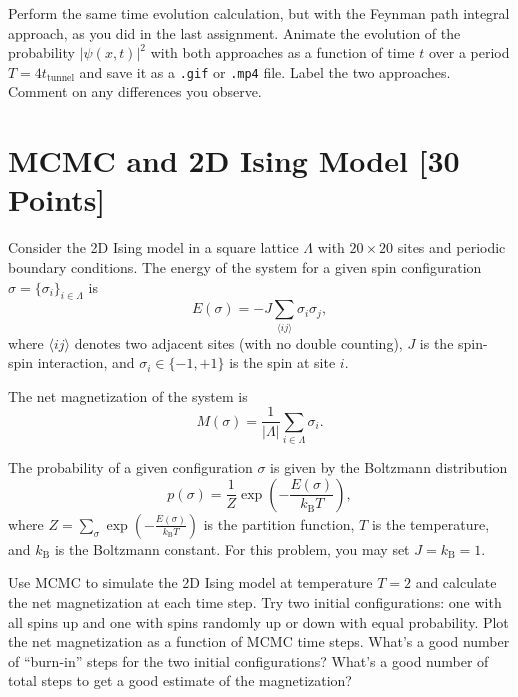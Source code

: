 \begin{problem}[10]
Perform the same time evolution calculation, but with the Feynman path integral approach, as you did in the last assignment.
Animate the evolution of the probability $|\psi(x, t)|^2$ with both approaches as a function of time $t$ over a period $T = 4t_\mathrm{tunnel}$ and save it as a \texttt{.gif} or \texttt{.mp4} file.
Label the two approaches.
Comment on any differences you observe.
\end{problem}

\begin{solution}
\end{solution}


\newpage
\section{MCMC and 2D Ising Model [30 Points]}

Consider the 2D Ising model in a square lattice $\Lambda$ with $20\times 20$ sites and periodic boundary conditions.
The energy of the system for a given spin configuration $\sigma = \{\sigma_i\}_{i\in \Lambda}$ is
\begin{equation}
  E(\sigma) = -J\sum_{\langle ij\rangle} \sigma_i\sigma_j,
\end{equation}
where $\langle i j \rangle$ denotes two adjacent sites (with no double counting), $J$ is the spin-spin interaction, and $\sigma_i \in \{ -1, +1\}$ is the spin at site $i$.

The net magnetization of the system is
\begin{equation}
  M(\sigma) = \frac{1}{|\Lambda|}\sum_{i\in \Lambda} \sigma_i.
\end{equation}

The probability of a given configuration $\sigma$ is given by the Boltzmann distribution
\begin{equation}
  p(\sigma) = \frac{1}{Z}\exp \left(-\frac{E(\sigma)}{k_\mathrm{B}T}\right),
\end{equation}
where $Z = \sum_{\sigma} \exp \left(-\frac{E(\sigma)}{k_\mathrm{B}T}\right)$ is the partition function, $T$ is the temperature, and $k_\mathrm{B}$ is the Boltzmann constant.
For this problem, you may set $J=k_\mathrm{B}=1$.

\begin{problem}[10]
Use MCMC to simulate the 2D Ising model at temperature $T=2$ and calculate the net magnetization at each time step.
Try two initial configurations: one with all spins up and one with spins randomly up or down with equal probability.
Plot the net magnetization as a function of MCMC time steps.
What's a good number of ``burn-in'' steps for the two initial configurations?
What's a good number of total steps to get a good estimate of the magnetization?
\end{problem}

